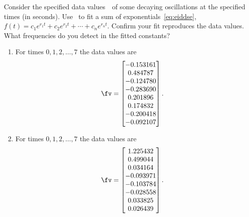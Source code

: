 \begin{exercise} \label{ex:} 
Consider the specified data values~\fv\ of some decaying oscillations at the specified times (in seconds).
Use \script\ to fit a sum of exponentials~\eqref{eq:eiddse}, \(f(t)=c_1e^{r_1t}+c_2e^{r_2t}+\cdots+c_ne^{r_nt}\).
Confirm your fit reproduces the data values.
What frequencies do you detect in the fitted constants?
\begin{enumerate}
\item  For times \(0,1,2,\ldots,7\) the data values are 
\setbox\ajrqrbox\hbox{}\marginpar{\usebox{\ajrqrbox}}%
\[ \fv=\begin{bmatrix} -0.153161
\\  0.484787
\\ -0.124780
\\ -0.283690
\\  0.201896
\\  0.174832
\\ -0.200418
\\ -0.092107 \end{bmatrix}.\]
  
\item  For times \(0,1,2,\ldots,7\) the data values are 
\setbox\ajrqrbox\hbox{}\marginpar{\usebox{\ajrqrbox}}%
\[ \fv=\begin{bmatrix} 1.225432
\\  0.499044
\\  0.034164
\\ -0.093971
\\ -0.103784
\\ -0.028558
\\  0.033825
\\  0.026439 \end{bmatrix}.\]
  

\end{enumerate}
\end{exercise}
